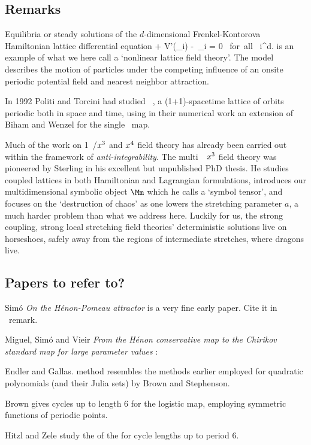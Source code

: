 \subsection{Remarks}

Equilibria or steady solutions of
the $d$-dimensional Frenkel-Kontorova Hamiltonian lattice differential
equation
\beq
{} + V'(\ssp_i) - \Box\,\ssp_i
    = 0 \ \mbox{for all} \ i\in{}^d.
is an example of what we here call a `nonlinear lattice field theory'.
The model describes the motion of particles under the
competing influence of an onsite periodic potential field and nearest
neighbor attraction.

In 1992 Politi and Torcini had
studied \emph{\spt\ \Henon}, a (1+1)-spacetime lattice of
orbits periodic both in space and time, using in their
 numerical work an extension of Biham and Wenzel for
the single \Henon\ map.

Much of the work on 1\dmn\ \henlatt/$x^3$ and $x^4$ field theory
has already been carried out within the framework of {\em
anti-integrability}.
The multi\dmn\ \spt\ $x^3$ field theory was pioneered by
Sterling in his excellent but unpublished
 {PhD thesis}. He
studies {coupled {\HenonMap} lattices} in both Hamiltonian and Lagrangian
formulations, introduces our multidimensional symbolic object $\Mm$ which
he calls a `symbol tensor', and focuses on the `destruction of chaos' as
one lowers the stretching parameter $a$, a much harder problem than what
we address here. Luckily for us, the strong coupling, strong local
stretching field theories' deterministic solutions live on horseshoes,
safely away from the regions of intermediate stretches, where dragons
live.


  {
\subsection{Papers to refer to?}

Sim{\'o} {\em On the {H{\'e}non-Pomeau} attractor}
is a very fine early paper. Cite it in \Henon\ remark.

Miguel, Sim{\'{o}} and Vieir {\em From the {H{\'{e}}non}
conservative map to the {Chirikov} standard map for large parameter
values} :

Endler and Gallas.
method resembles the methods
earlier employed for quadratic polynomials (and their Julia sets) by
Brown
and Stephenson.

Brown gives cycles up to length 6 for the logistic map,
employing symmetric functions of periodic points.

Hitzl and Zele
study the of the {\HenonMap} for cycle lengths  up to period  6.
   }
